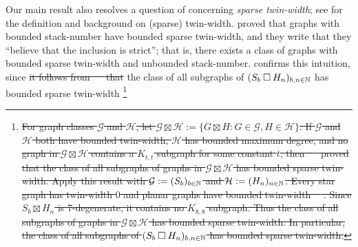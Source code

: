 \documentclass[kpfonts]{patmorin}
\newcommand{\CartProd}{\mathbin{\square}}
\providecommand{\DIFdel}[1]{{\protect\color{red}\sout{#1}}}                      %
\providecommand{\DIFdelbegin}{} %
\providecommand{\DIFdelend}{} %
\newcommand{\DIFscaledelfig}{0.5}
\newlength{\DIFdelgraphicswidth} %
\newlength{\DIFdelgraphicsheight} %
\newcommand{\DIFdelincludegraphics}[2][]{%
\sbox{\DIFdelgraphicsbox}{\DIFOincludegraphics[#1]{#2}}%
\settoboxwidth{\DIFdelgraphicswidth}{\DIFdelgraphicsbox} %
\settoboxtotalheight{\DIFdelgraphicsheight}{\DIFdelgraphicsbox} %
\scalebox{\DIFscaledelfig}{%
\parbox[b]{\DIFdelgraphicswidth}{\usebox{\DIFdelgraphicsbox}\\[-\baselineskip] \rule{\DIFdelgraphicswidth}{0em}}\llap{\resizebox{\DIFdelgraphicswidth}{\DIFdelgraphicsheight}{%
\setlength{\unitlength}{\DIFdelgraphicswidth}%
\begin{picture}(1,1)%
\thicklines\linethickness{2pt} %
{\color[rgb]{1,0,0}\put(0,0){\framebox(1,1){}}}%
{\color[rgb]{1,0,0}\put(0,0){\line( 1,1){1}}}%
{\color[rgb]{1,0,0}\put(0,1){\line(1,-1){1}}}%
\end{picture}%
}\hspace*{3pt}}} %
} %
\DeclareRobustCommand{\DIFdelbegin}{\DIFOdelbegin \let\includegraphics\DIFdelincludegraphics} %
\DeclareRobustCommand{\DIFdelend}{\DIFOaddend \let\includegraphics\DIFOincludegraphics} %
\begin{document}
Our main result also resolves a question of \citet{BGKTWb} concerning \emph{sparse twin-width}; see \citep{BKTW,BGKTWa,BGKTWb} for the definition and background on (sparse) twin-width. \citet{BGKTWb} proved that graphs with bounded stack-number have bounded sparse twin-width, and they write that they ``believe that the inclusion is strict''; that is, there exists a class of graphs with bounded sparse twin-width and unbounded stack-number.  confirms this intuition, since \DIFdelbegin \DIFdel{it follows from \mbox{%
\citep[Theorem~10]{BGKTWb} }\hspace{0pt}%
that }\DIFdelend the class of all subgraphs of $(S_b \CartProd H_n)_{b,n\in\N}$ has bounded sparse twin-width \DIFdelbegin \footnote{\DIFdel{For graph classes $\mathcal{G}$ and $\mathcal{H}$, let $\mathcal{G}\boxtimes \mathcal{H} := \{ G\boxtimes H: G \in \mathcal{G}, H\in \mathcal{H}\}$. If $\mathcal{G}$ and $\mathcal{H}$ both have bounded twin-width, $\mathcal{H}$ has bounded maximum degree, and no graph in $\mathcal{G}\boxtimes \mathcal{H}$ contains a $K_{t,t}$ subgraph for some constant $t$, then \mbox{%
\citet[Theorem~10]{BGKTWb} }\hspace{0pt}%
proved that the class of all subgraphs of graphs in $\mathcal{G}\boxtimes \mathcal{H}$ has bounded sparse twin-width. Apply this result with $\mathcal{G}:= (S_b)_{b\in \mathbb{N}}$ and $\mathcal{H}:= (H_n)_{n\in\mathbb{N}}$. Every star graph has twin-width $0$ and planar graphs have bounded twin-width~\mbox{%
\citep{BKTW}}\hspace{0pt}%
. Since $S_b \boxtimes H_n$ is 7-degenerate, it contains no $K_{8,8}$ subgraph. Thus the class of all subgraphs of graphs in $\mathcal{G} \boxtimes \mathcal{H}$ has bounded sparse twin-width. In particular, the class of all subgraphs of $(S_b \CartProd H_n)_{b,n\in\N}$ has bounded sparse twin-width.}}%
\addtocounter{footnote}{-1}%
\end{document}
